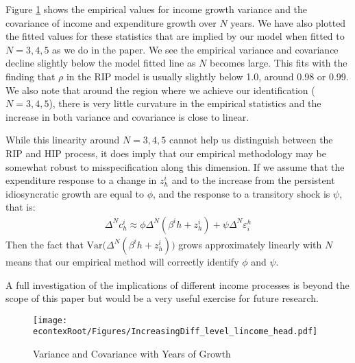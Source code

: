 \documentclass[titlepage]{\econtex}\newcommand{\texname}{ConsumptionHeterogeneity}
\begin{document}
Figure \ref{fig:increasing_diff} shows the empirical values for income growth variance and the covariance of income and expenditure growth over $N$ years. We have also plotted the fitted values for these statistics that are implied by our model when fitted to $N=3,4,5$ as we do in the paper. We see the empirical variance and covariance decline slightly below the model fitted line as $N$ becomes large. This fits with the finding that $\rho$ in the RIP model is usually slightly below 1.0, around 0.98 or 0.99. We also note that around the region where we achieve our identification ($N=3,4,5$), there is very little curvature in the empirical statistics and the increase in both variance and covariance is close to linear.

While this linearity around $N=3,4,5$ cannot help us distinguish between the RIP and HIP process, it does imply that our empirical methodology may be somewhat robust to misspecification along this dimension. If we assume that the expenditure response to a change in $z^i_h$ and to the increase from the persistent idiosyncratic growth are equal to $\phi$, and the response to a transitory shock is $\psi$, that is:
\begin{align*}
	\Delta^N c^i_h \approx \phi \Delta^N (\beta^i h + z^i_h) + \psi \Delta^N \varepsilon^h_i
\end{align*}
Then the fact that $\mathrm{Var}\big( \Delta^N (\beta^i h + z^i_h) \big)$ grows approximately linearly with $N$ means that our empirical method will correctly identify $\phi$ and $\psi$.

A full investigation of the implications of different income processes is beyond the scope of this paper but would be a very useful exercise for future research.
	
\begin{figure} 
	\begin{centering}
		\texttt{[image: \\econtexRoot/Figures/IncreasingDiff\_level\_lincome\_head.pdf]}
		\caption{Variance and Covariance with Years of Growth}
		\label{fig:increasing_diff}
	\end{centering}
\end{figure}
\end{document}

